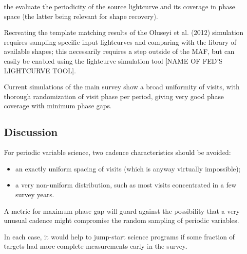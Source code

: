the evaluate the periodicity of the source lightcurve and its coverage in phase space (the latter being relevant for shape recovery). 

Recreating the template matching results of the Oluseyi et al. (2012) simulation requires sampling specific input lightcurves and comparing with the library of available shapes; this necessarily requires a step outside of the MAF, but can easily be enabled using the lightcurve simulation tool [NAME OF FED'S LIGHTCURVE TOOL].
 



Current simulations of the main survey show a broad uniformity of visits, with thorough randomization of visit phase per period, giving very good phase coverage with minimum phase gaps.



\subsection{Discussion}
\label{sec:keyword:discussion}

For periodic variable science, two cadence characteristics should be avoided:
\begin{itemize}
\item an exactly uniform spacing of visits (which is anyway virtually impossible); \
\item a very non-uniform distribution, such as most visits concentrated in a few survey years.
 \end{itemize}

A metric for maximum phase gap will guard against the possibility that a very unusual cadence might compromise the random sampling of periodic variables.

In each case, it would help to jump-start science programs if some fraction of targets had more complete measurements early in the survey.



\navigationbar

